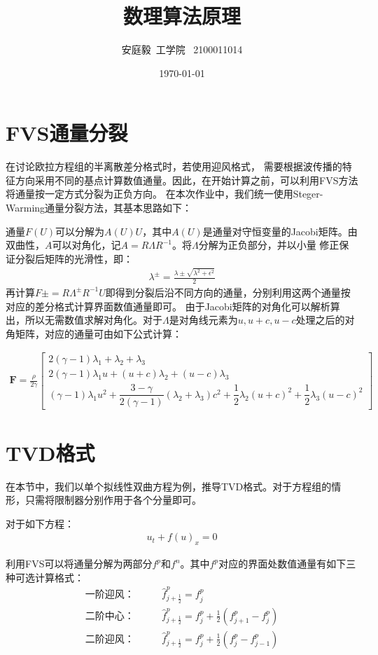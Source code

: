 \documentclass[12pt, a4paper]{article}
\title{数理算法原理}
\author{安庭毅\ 工学院 \ 2100011014}
\date{\today} %
\begin{document}
\maketitle %
\section{FVS通量分裂}
在讨论欧拉方程组的半离散差分格式时，若使用迎风格式，
需要根据波传播的特征方向采用不同的基点计算数值通量。因此，在开始计算之前，可以利用FVS方法将通量按一定方式分裂为正负方向。
在本次作业中，我们统一使用Steger-Warming通量分裂方法，其基本思路如下：

通量$F(U)$可以分解为$A(U)U$，其中$A(U)$是通量对守恒变量的Jacobi矩阵。由双曲性，$A$可以对角化，记$A=R\Lambda R^{-1}$。将$\Lambda$分解为正负部分，并以小量
修正保证分裂后矩阵的光滑性，即：
\begin{align}
    \lambda^{\pm} = \frac{\lambda\pm\sqrt{\lambda ^ 2 + \epsilon ^ 2}}{2} 
\end{align}
再计算$F\pm=R\Lambda^{\pm}R^{-1}U$即得到分裂后沿不同方向的通量，分别利用这两个通量按对应的差分格式计算界面数值通量即可。
由于Jacobi矩阵的对角化可以解析算出，所以无需数值求解对角化。对于$\Lambda$是对角线元素为$u, u+c, u-c$处理之后的对角矩阵，对应的通量可由如下公式计算：

\begin{align}
\mathbf{F} = \frac{\rho}{2\gamma}
\begin{bmatrix}
2(\gamma - 1)\lambda_1 + \lambda_2 + \lambda_3 \\
2(\gamma - 1)\lambda_1 u + (u + c)\lambda_2 + (u - c)\lambda_3 \\
(\gamma - 1)\lambda_1 u^2 + \dfrac{3 - \gamma}{2(\gamma - 1)}(\lambda_2 + \lambda_3)c^2 + \dfrac{1}{2}\lambda_2(u + c)^2 + \dfrac{1}{2}\lambda_3(u - c)^2
\end{bmatrix}
\end{align}

\section{TVD格式}
在本节中，我们以单个拟线性双曲方程为例，推导TVD格式。对于方程组的情形，只需将限制器分别作用于各个分量即可。

对于如下方程：
\begin{align}
    u_t + f(u)_x = 0 
\end{align}

利用FVS可以将通量分解为两部分$f^p$和$f^n$。其中$f^p$对应的界面处数值通量有如下三种可选计算格式：
\begin{align}
    \text{一阶迎风：} \qquad &\widehat{f}^p_{j+\frac{1}{2}} = f^p_{j} \\
    \text{二阶中心：} \qquad &\widehat{f}^p_{j+\frac{1}{2}} = f^p_{j} + \frac{1}{2}(f^p_{j+1}-f^p_j)\\
    \text{二阶迎风：} \qquad &\widehat{f}^p_{j+\frac{1}{2}} = f^p_{j} + \frac{1}{2}(f^p_{j}-f^p_{j-1})\\
\end{align}
\end{document}
